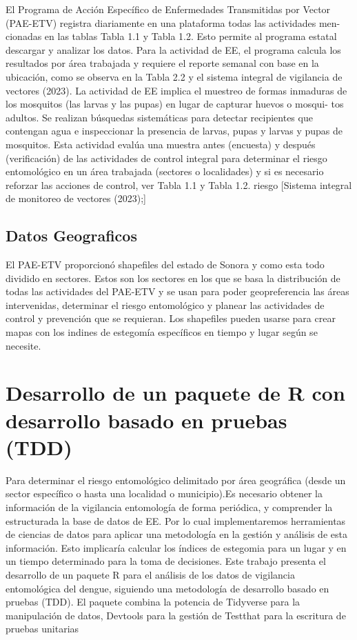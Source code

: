 \documentclass[
  letterpaper,
  twocolumn,
  landscape]{report}
\begin{document}
El Programa de Acción Específico de Enfermedades Transmitidas por Vector
(PAE-ETV) registra diariamente en una plataforma todas las actividades
men- cionadas en las tablas Tabla 1.1 y Tabla 1.2. Esto permite al
programa estatal descargar y analizar los datos. Para la actividad de
EE, el programa calcula los resultados por área trabajada y requiere el
reporte semanal con base en la ubicación, como se observa en la Tabla
2.2 y el sistema integral de vigilancia de vectores (2023). La actividad
de EE implica el muestreo de formas inmaduras de los mosquitos (las
larvas y las pupas) en lugar de capturar huevos o mosqui- tos adultos.
Se realizan búsquedas sistemáticas para detectar recipientes que
contengan agua e inspeccionar la presencia de larvas, pupas y larvas y
pupas de mosquitos. Esta actividad evalúa una muestra antes (encuesta) y
después (verificación) de las actividades de control integral para
determinar el riesgo entomológico en un área trabajada (sectores o
localidades) y si es necesario reforzar las acciones de control, ver
Tabla 1.1 y Tabla 1.2. riesgo {[}Sistema integral de monitoreo de
vectores (2023);{]}

\subsection{Datos Geograficos}\label{datos-geograficos}

El PAE-ETV proporcionó shapefiles del estado de Sonora y como esta todo
dividido en sectores. Estos son los sectores en los que se basa la
distribución de todas las actividades del PAE-ETV y se usan para poder
geopreferencia las áreas intervenidas, determinar el riesgo entomológico
y planear las actividades de control y prevención que se requieran. Los
shapefiles pueden usarse para crear mapas con los indines de estegomía
específicos en tiempo y lugar según se necesite.

\section{Desarrollo de un paquete de R con desarrollo basado en pruebas
(TDD)}\label{desarrollo-de-un-paquete-de-r-con-desarrollo-basado-en-pruebas-tdd}

Para determinar el riesgo entomológico delimitado por área geográfica
(desde un sector específico o hasta una localidad o municipio).Es
necesario obtener la información de la vigilancia entomología de forma
periódica, y comprender la estructurada la base de datos de EE. Por lo
cual implementaremos herramientas de ciencias de datos para aplicar una
metodología en la gestión y análisis de esta información. Esto
implicaría calcular los índices de estegomia para un lugar y en un
tiempo determinado para la toma de decisiones. Este trabajo presenta el
desarrollo de un paquete R para el análisis de los datos de vigilancia
entomológica del dengue, siguiendo una metodología de desarrollo basado
en pruebas (TDD). El paquete combina la potencia de Tidyverse para la
manipulación de datos, Devtools para la gestión de Testthat para la
escritura de pruebas unitarias
\end{document}
